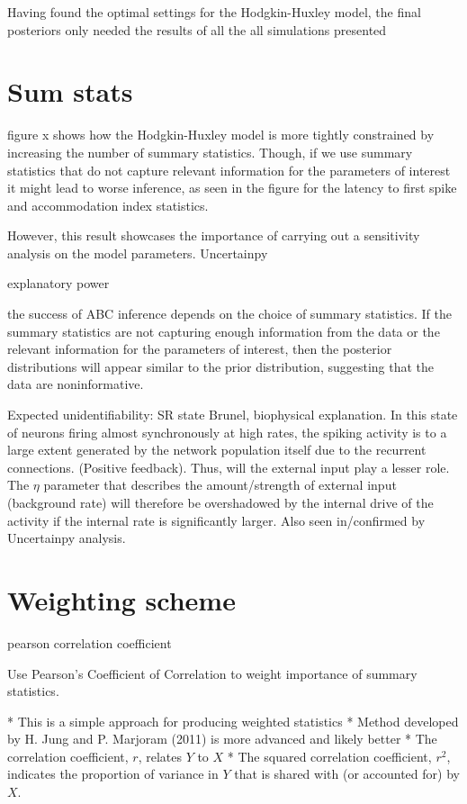 Having found the optimal settings for the Hodgkin-Huxley model, the final posteriors only needed the results of all the all simulations presented

\section{Sum stats}

figure x shows how the Hodgkin-Huxley model is more tightly constrained by increasing the number of summary statistics. Though, if we use summary statistics that do not capture relevant information for the parameters of interest it might lead to worse inference, as seen in the figure for the latency to first spike and accommodation index statistics.  

However, this result showcases the importance of carrying out a sensitivity analysis on the model parameters. Uncertainpy

explanatory power

the success of ABC inference depends on the choice of summary statistics. If the summary statistics are not capturing enough information from the data or the relevant information for the parameters of interest, then the posterior distributions will appear similar to the prior distribution, suggesting that the data are noninformative. 

Expected unidentifiability: SR state Brunel, biophysical explanation. In this state of neurons firing almost synchronously at high rates, the spiking activity is to a large extent generated by the network population itself due to the recurrent connections. (Positive feedback). Thus, will the external input play a lesser role. The $\eta$ parameter that describes the amount/strength of external input (background rate) will therefore be overshadowed by the internal drive of the activity if the internal rate is significantly larger. Also seen in/confirmed by Uncertainpy analysis.

\section{Weighting scheme}

pearson correlation coefficient

Use Pearson's Coefficient of Correlation to weight importance of summary statistics.

* This is a simple approach for producing weighted statistics 
    * Method developed by H. Jung and P. Marjoram (2011) is more advanced and likely better
* The correlation coefficient, $r$, relates $Y$ to $X$ 
* The squared correlation coefficient, $r^2$, indicates the proportion of variance in $Y$ that is shared with (or accounted for) by $X$.

